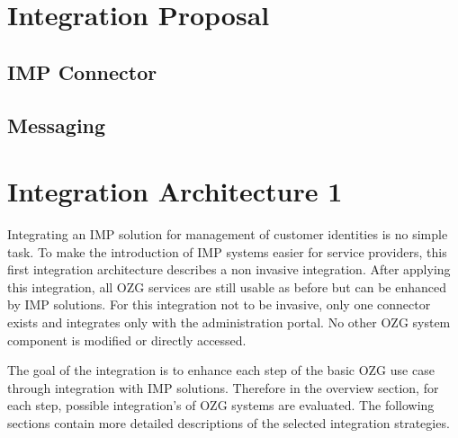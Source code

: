 \documentclass[
     12pt,         %
     a4paper,      %
     BCOR=10mm,version=first,     %
     DIV=14,version=first,        %
     ]{scrreprt}
\begin{document}
\section{Integration Proposal}

\subsection{IMP Connector}

\subsection{Messaging}

\section{Integration Architecture 1}

Integrating an IMP solution for management of customer identities is no simple task. To make the introduction of IMP systems easier for service providers, this first integration architecture describes a non invasive integration. After applying this integration, all OZG services are still usable as before but can be enhanced by IMP solutions. For this integration not to be invasive, only one connector exists and integrates only with the administration portal. No other OZG system component is modified or directly accessed.

The goal of the integration is to enhance each step of the basic OZG use case through integration with IMP solutions. Therefore in the overview section, for each step, possible integration's of OZG systems are evaluated. The following sections contain more detailed descriptions of the selected integration strategies.
\end{document}
